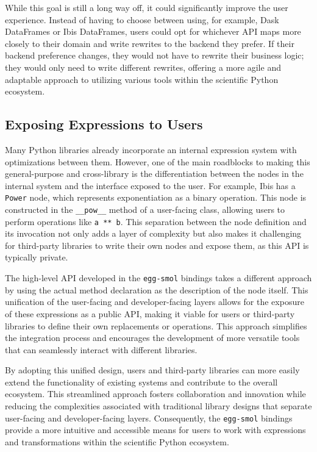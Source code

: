 \documentclass[sigplan,screen,review]{acmart}
\begin{document}
While this goal is still a long way off, it could significantly improve the user experience. Instead of having to choose between using, for example, Dask DataFrames or Ibis DataFrames, users could opt for whichever API maps more closely to their domain and write rewrites to the backend they prefer. If their backend preference changes, they would not have to rewrite their business logic; they would only need to write different rewrites, offering a more agile and adaptable approach to utilizing various tools within the scientific Python ecosystem.

\subsection{Exposing Expressions to Users}

Many Python libraries already incorporate an internal expression system with optimizations between them. However, one of the main roadblocks to making this general-purpose and cross-library is the differentiation between the nodes in the internal system and the interface exposed to the user. For example, Ibis has a \verb|Power| node, which represents exponentiation as a binary operation. This node is constructed in the \verb|__pow__| method of a user-facing class, allowing users to perform operations like \verb|a ** b|. This separation between the node definition and its invocation not only adds a layer of complexity but also makes it challenging for third-party libraries to write their own nodes and expose them, as this API is typically private.

The high-level API developed in the \verb|egg-smol| bindings takes a different approach by using the actual method declaration as the description of the node itself. This unification of the user-facing and developer-facing layers allows for the exposure of these expressions as a public API, making it viable for users or third-party libraries to define their own replacements or operations. This approach simplifies the integration process and encourages the development of more versatile tools that can seamlessly interact with different libraries.

By adopting this unified design, users and third-party libraries can more easily extend the functionality of existing systems and contribute to the overall ecosystem. This streamlined approach fosters collaboration and innovation while reducing the complexities associated with traditional library designs that separate user-facing and developer-facing layers. Consequently, the \verb|egg-smol| bindings provide a more intuitive and accessible means for users to work with expressions and transformations within the scientific Python ecosystem.
\end{document}
